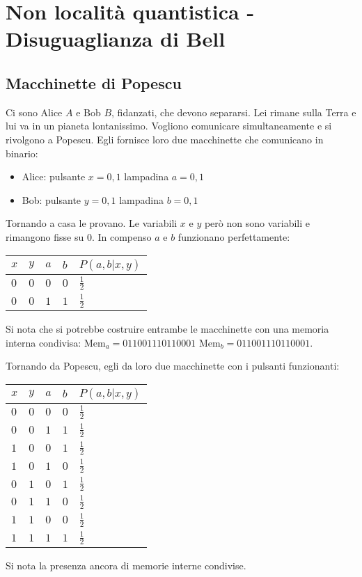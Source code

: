 \chapter[Non località quantistica]{Non località quantistica - Disuguaglianza di Bell} %
\section{Macchinette di Popescu} %
Ci sono Alice $A$ e Bob $B$, fidanzati, che devono separarsi. Lei rimane sulla Terra e lui va in un pianeta lontanissimo. Vogliono comunicare simultaneamente e si rivolgono a Popescu. Egli fornisce loro due macchinette che comunicano in binario:
\begin{itemize}
\item Alice: pulsante $x=0,1$ lampadina $a=0,1$
\item Bob: pulsante $y=0,1$ lampadina $b=0,1$
\end{itemize}

Tornando a casa le provano. Le variabili $x$ e $y$ però non sono variabili e rimangono fisse su $0$. In compenso $a$ e $b$ funzionano perfettamente: \\
\begin{tabularx}{\textwidth}{XXXXX}
\toprule
$x$ & $y$ & $a$ & $b$ & $P\left(a,b|x,y\right)$ \\
\midrule
$0$ & $0$ & $0$ & $0$ & $\frac{1}{2}$ \\
$0$ & $0$ & $1$ & $1$ & $\frac{1}{2}$ \\
\bottomrule
\end{tabularx}
Si nota che si potrebbe costruire entrambe le macchinette con una memoria interna condivisa:
Mem$_a=011001110110001$ Mem$_b=011001110110001$.

Tornando da Popescu, egli da loro due macchinette con i pulsanti funzionanti: \\
\begin{tabularx}{\textwidth}{XXXXX}
\toprule
$x$ & $y$ & $a$ & $b$ & $P\left(a,b|x,y\right)$ \\
\midrule
$0$ & $0$ & $0$ & $0$ & $\frac{1}{2}$ \\
$0$ & $0$ & $1$ & $1$ & $\frac{1}{2}$ \\
$1$ & $0$ & $0$ & $1$ & $\frac{1}{2}$ \\
$1$ & $0$ & $1$ & $0$ & $\frac{1}{2}$ \\
$0$ & $1$ & $0$ & $1$ & $\frac{1}{2}$ \\
$0$ & $1$ & $1$ & $0$ & $\frac{1}{2}$ \\
$1$ & $1$ & $0$ & $0$ & $\frac{1}{2}$ \\
$1$ & $1$ & $1$ & $1$ & $\frac{1}{2}$ \\
\bottomrule
\end{tabularx}
Si nota la presenza ancora di memorie interne condivise.

